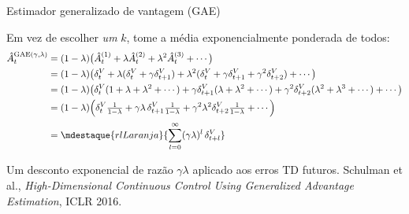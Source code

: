 \documentclass[aspectratio=169, 10pt]{beamer}
\newcommand{\Ahat}{\hat{A}}
\begin{document}
\begin{frame}{Estimador generalizado de vantagem (GAE)}

  Em vez de escolher \emph{um} $k$, tome a média exponencialmente ponderada de todos:
  {\small
  \begin{align*}
    \Ahat^{\mathrm{GAE}(\gamma,\lambda)}_t
      &= (1-\lambda)\bigl(\Ahat^{(1)}_t + \lambda \Ahat^{(2)}_t + \lambda^2\Ahat^{(3)}_t + \cdots\bigr)\\
      &= (1-\lambda)\bigl(\delta^V_t + \lambda(\delta^V_t + \gamma\delta^V_{t+1})
         + \lambda^2(\delta^V_t + \gamma\delta^V_{t+1} + \gamma^2\delta^V_{t+2}) + \cdots\bigr)\\
      &= (1-\lambda)\bigl(\delta^V_t(1+\lambda+\lambda^2+\cdots)
         + \gamma\delta^V_{t+1}(\lambda+\lambda^2+\cdots)
         + \gamma^2\delta^V_{t+2}(\lambda^2+\lambda^3+\cdots) + \cdots\bigr)\\
      &= (1-\lambda)\Bigl(\delta^V_t\tfrac{1}{1-\lambda}
         + \gamma\lambda\,\delta^V_{t+1}\tfrac{1}{1-\lambda}
         + \gamma^2\lambda^2\delta^V_{t+2}\tfrac{1}{1-\lambda} + \cdots\Bigr)\\[0.2em]
      &= \mdestaque{rlLaranja}{\sum_{l=0}^{\infty}(\gamma\lambda)^{l}\,\delta^V_{t+l}}
  \end{align*}}

  \vspace{-0.4em}
  \begin{ideiabox}
    Um desconto exponencial de razão $\gamma\lambda$ aplicado aos erros TD futuros.
    Schulman et al., \emph{High-Dimensional Continuous Control Using Generalized
    Advantage Estimation}, ICLR 2016.
  \end{ideiabox}
\end{frame}
\end{document}
